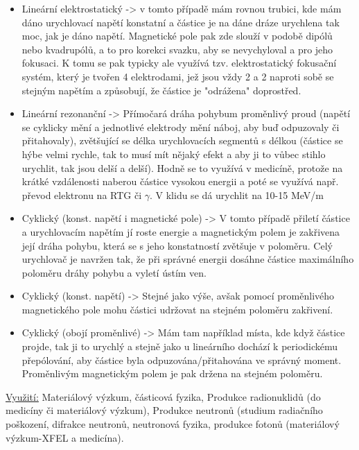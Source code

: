 \begin{itemize}
    \item Lineární elektrostatický -> v tomto případě mám rovnou trubici, kde mám dáno urychlovací napětí konstatní a částice je na dáne dráze urychlena tak moc, jak je dáno napětí. Magnetické pole pak zde slouží v podobě dipólů nebo kvadrupólů, a to pro korekci svazku, aby se nevychyloval a pro jeho fokusaci. K tomu se pak typicky ale využívá tzv. elektrostatický fokusační systém, který je tvořen 4 elektrodami, jež jsou vždy 2 a 2 naproti sobě se stejným napětím a způsobují, že částice je "odrážena" doprostřed.
    \item Lineární rezonanční -> Přímočará dráha pohybum proměnlivý proud (napětí se cyklicky mění a jednotlivé elektrody mění náboj, aby buď odpuzovaly či přitahovaly), zvětšující se délka urychlovacích segmentů s délkou (částice se hýbe velmi rychle, tak to musí mít nějaký efekt a aby ji to vůbec stihlo urychlit, tak jsou delší a delší). Hodně se to využívá v medicíně, protože na krátké vzdálenosti naberou částice vysokou energii a poté se využívá např. převod elektronu na RTG či $\gamma$. V klidu se dá urychlit na 10-15 MeV/m

    \item Cyklický (konst. napětí i magnetické pole) -> V tomto případě přiletí částice a urychlovacím napětím jí roste energie a magnetickým polem je zakřivena její dráha pohybu, která se s jeho konstatností zvětšuje v poloměru. Celý urychlovač je navržen tak, že při správné energii dosáhne částice maximálního poloměru dráhy pohybu a vyletí ústím ven.

    \item Cyklický (konst. napětí) -> Stejné jako výše, avšak pomocí proměnlivého magnetického pole mohu částici udržovat na stejném poloměru zakřivení.

    \item Cyklický (obojí proměnlivé) -> Mám tam například místa, kde když částice projde, tak ji to urychlý a stejně jako u lineárního dochází k periodickému přepólování, aby částice byla odpuzována/přitahována ve správný moment. Proměnlivým magnetickým polem je pak držena na stejném poloměru.
\end{itemize}

\underline{Využití:} Materiálový výzkum, částicová fyzika, Produkce radionuklidů (do medicíny či materiálový výzkum), Produkce neutronů (studium radiačního poškození, difrakce neutronů, neutronová fyzika, produkce fotonů (materiálový výzkum-XFEL a medicína).


